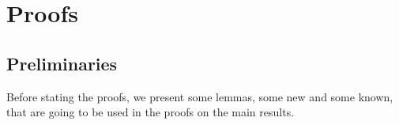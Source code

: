 \documentclass[onecolumn]{IEEEtran}
\begin{document}
%
%
%
%
%





\section{Proofs}\label{sec:proof}



\subsection{Preliminaries}
Before stating the proofs, we present some lemmas, some new and some known, that are going to be used in the proofs on the main results. 
\end{document}
